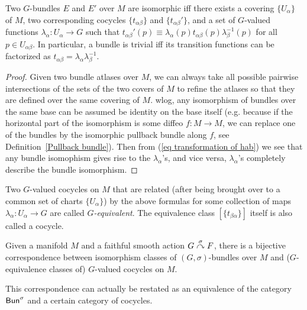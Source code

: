 \begin{thm}\label{bundle isomorphism thm}
Two $G$-bundles $E$ and $E'$ over $M$ are isomorphic iff there exists a covering $\{U_\alpha \}$ of $M$, two corresponding cocycles $\{t_{\alpha\beta}\}$ and $\{t_{\alpha\beta}'\}$, and a set of $G$-valued functions $\lambda_\alpha:U_\alpha\to G$ such that $t_{\alpha\beta}'(p)\equiv \lambda_\alpha (p) t_{\alpha\beta}(p) \lambda_\beta^{-1}(p)$ for all $p\in U_{\alpha\beta}$. In particular, a bundle is trivial iff its transition functions can be factorized as $t_{\alpha\beta}=\lambda_\alpha \lambda_\beta^{-1}$.
\end{thm}
\begin{proof}
Given two bundle atlases over $M$, we can always take all possible pairwise intersections of the sets of the two covers of $M$ to refine the atlases so that they are defined over the same covering of $M$. \gls{wlog}, any isomorphism of bundles over the same base can be assumed be identity on the base itself (e.g. because if the horizontal part of the isomorphism is some diffeo $f:M\to M$, we can replace one of the bundles by the isomorphic pullback bundle along $f$, see Definition~\ref{Pullback bundle}). Then from (\ref{eq transformation of hab}) we see that any bundle isomophism gives rise to the $\lambda_\alpha$'s, and vice versa, $\lambda_\alpha$'s completely describe the bundle isomorphism. 
\end{proof}
\begin{defn}
    Two $G$-valued cocycles on $M$ that are related (after being brought over to a common set of charts $\{U_\alpha\}$) by the above formulas for some collection of maps $\lambda_\alpha:U_\alpha\to G$ are called \emph{$G$-equivalent}. The equivalence class $[\{t_{\beta\alpha}\}]$ itself is also called a cocycle.
\end{defn}
\begin{cor}
    Given a manifold $M$ and a faithful smooth action $G\overset{\sigma}{\curvearrowright} F$, there is a bijective correspondence between isomorphism classes of $(G,\sigma)$-bundles over $M$ and ($G$-equivalence classes of) $G$-valued cocycles on $M$.
\end{cor}
This correspondence can actually be restated as an equivalence of the category $\mathsf{Bun}^\sigma$ and a certain category of cocycles.

